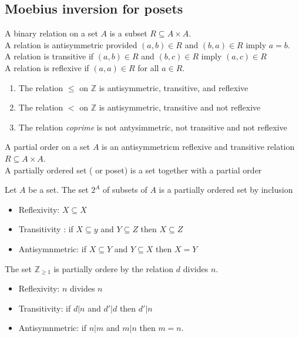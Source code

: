 \documentclass[../main.tex]{subfiles}
\begin{document}
\subsection{Moebius inversion for posets}
\begin{defn}
	A binary relation on a set $A$ is a subset $R \subseteq A \times A$.\\
	A relation is antisymmetric provided $(a,b) \in R$ and $( b,a) \in R$ imply $a=b$.\\
	A relation is transitive if $( a,b) \in R$ and $( b,c) \in R$ imply $( a,c) \in R$ \\
	A relation is reflexive if $( a,a) \in R$ for all $a\in R$.
\end{defn}
\begin{exemple}
\begin{enumerate}
\item The relation $ \leq $ on $\mathbb{Z}$ is antisymmetric, transitive, and reflexive
\item The relation $<$ on  $\mathbb{Z}$ is antisymmetric, transitive and not reflexive
\item The relation \textit { coprime}  is not antysimmetric, not transitive and not reflexive
\end{enumerate}
		
\end{exemple}
\begin{defn}
	A partial order on a set $A$ is an antisymmetricm reflexive and transitive relation $R \subseteq A \times A$.\\
	A partially ordered set ( or poset)  is a set together with a partial order	
\end{defn}
\begin{exemple}
Let $A$ be  a set. The set $2^{A}$ of subsets of $A$ is a partially ordered set by inclusion
\begin{itemize}
\item Reflexivity: $X \subseteq X$ 
\item Transitivity : if $X  \subseteq y$ and $Y \subseteq Z$ then $X \subseteq Z$ 
\item Antisymnmetric: if $X  \subseteq Y $ and $Y \subseteq X$ then $X=Y$
\end{itemize}

\end{exemple}
\begin{exemple}
The set $\mathbb{Z}_{ \geq 1} $ is partially ordere by the relation $d$ divides $n$.\\
\begin{itemize}
\item Reflexivity: $n$ divides $n$ 
\item Transitivity: if $d|n$ and $ d'| d$ then $d'|n$ 
\item Antisymnmetric: if $n|m$ and $m|n$ then $m=n$.
\end{itemize}

\end{exemple}
\end{document}
